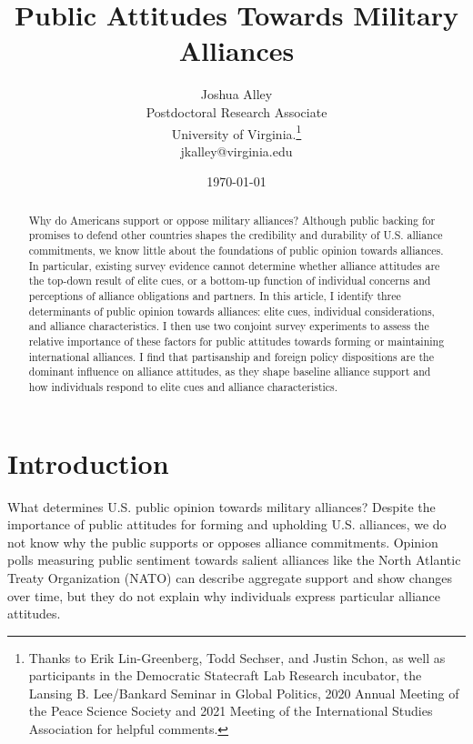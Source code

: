 \documentclass[12pt]{article}
\title{\textbf{Public Attitudes Towards Military Alliances}}
\author{Joshua Alley \\
Postdoctoral Research Associate \\
University of Virginia.\thanks{Thanks to Erik Lin-Greenberg, Todd Sechser, and Justin Schon, as well as participants in the Democratic Statecraft Lab Research incubator, the Lansing B. Lee/Bankard Seminar in Global Politics, 2020 Annual Meeting of the Peace Science Society and 2021 Meeting of the International Studies Association for helpful comments.} \\
jkalley@virginia.edu
}
\date{\today}
\begin{document}
\maketitle 

\doublespace 

\begin{abstract}
Why do Americans support or oppose military alliances? 
Although public backing for promises to defend other countries shapes the credibility and durability of U.S. alliance commitments, we know little about the foundations of public opinion towards alliances.
In particular, existing survey evidence cannot determine whether alliance attitudes are the top-down result of elite cues, or a bottom-up function of individual concerns and perceptions of alliance obligations and partners. 
In this article, I identify three determinants of public opinion towards alliances: elite cues, individual considerations, and alliance characteristics. 
I then use two conjoint survey experiments to assess the relative importance of these factors for public attitudes towards forming or maintaining international alliances.  
I find that partisanship and foreign policy dispositions are the dominant influence on alliance attitudes, as they shape baseline alliance support and how individuals respond to elite cues and alliance characteristics.  
\end{abstract}


\newpage 


\section{Introduction}

What determines U.S. public opinion towards military alliances? 
Despite the importance of public attitudes for forming and upholding U.S. alliances, we do not know why the public supports or opposes alliance commitments. 
Opinion polls measuring public sentiment towards salient alliances like the North Atlantic Treaty Organization (NATO) can describe aggregate support and show changes over time, but they do not explain why individuals express particular alliance attitudes. 
\end{document}
